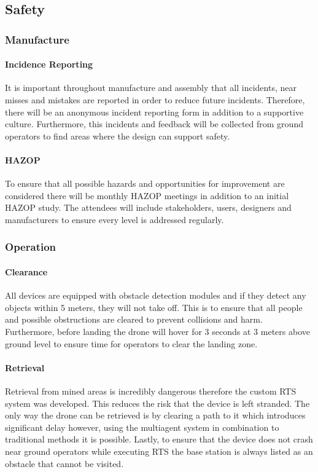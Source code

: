 \subsection{Safety}\label{sub_section:tgt_safety}
\subsubsection{Manufacture}\label{sub_sub_section:tgt_safety_manufacture}
\paragraph{Incidence Reporting}
It is important throughout manufacture and assembly that all incidents, near misses and mistakes are reported in order to reduce future incidents. Therefore, there will be an anonymous incident reporting form in addition to a supportive culture. Furthermore, this incidents and feedback will be collected from ground operators to find areas where the design can support safety.
\paragraph{\gls{HAZOP}}
To ensure that all possible hazards and opportunities for improvement are considered there will be monthly \gls{HAZOP} meetings in addition to an initial \gls{HAZOP} study. The attendees will include stakeholders, users, designers and manufacturers to ensure every level is addressed regularly.

\subsubsection{Operation}\label{sub_sub_section:tgt_safety_operation}
\paragraph{Clearance}
All devices are equipped with obstacle detection modules and if they detect any objects within 5 meters, they will not take off. This is to ensure that all people and possible obstructions are cleared to prevent collisions and harm. Furthermore, before landing the drone will hover for 3 seconds at 3 meters above ground level to ensure time for operators to clear the landing zone.
\paragraph{Retrieval}
Retrieval from mined areas is incredibly dangerous therefore the custom \gls{RTS} system was developed. This reduces the risk that the device is left stranded. The only way the drone can be retrieved is by clearing a path to it which introduces significant delay however, using the multiagent system in combination to traditional methods it is possible. Lastly, to ensure that the device does not crash near ground operators while executing \gls{RTS} the base station is always listed as an obstacle that cannot be visited.